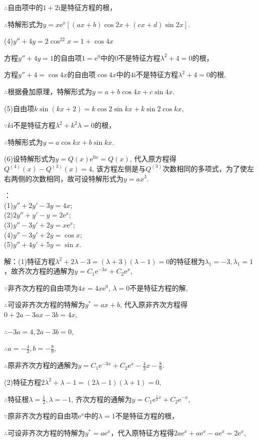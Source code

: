 \documentclass[12pt,UTF8]{ctexart}
\newcommand{\me}[0]{\mathrm e}
\newcommand{\m}[0]{\mathrm }
\begin{document}
\begin{enumerate}
$\therefore$自由项中的$1+2\m i$是特征方程的根，

$\therefore$特解形式为$y=x\me^x[(ax+b)\cos2x+(cx+d)\sin2x]$.

(4)$y''+4y=2\cos^22x=1+\cos4x$

方程$y''+4y=1$的自由项$1=\me^0$中的$0$不是特征方程$\lambda^2+4=0$的根，

方程$y''+4=\cos4x$的自由项$\cos4x$中的$4\m i$不是特征方程$\lambda^2+4=0$的根,

$\therefore$根据叠加原理，特解形式为$y=a+b\cos4x+c\sin4x$.

(5)自由项$k\sin(kx+2)=k\cos2\sin kx+k\sin2\cos kx$,

$\because k\m i$不是特征方程$\lambda^2+k^2\lambda=0$的根，

$\therefore$特解形式为$y=a\cos kx+b\sin kx$.

(6)设特解形式为$y=Q(x)\me^{0x}=Q(x)$, 代入原方程得$Q^{(4)}(x)-Q^{(3)}(x)=4$, 该方程左侧是与$Q^{(3)}$次数相同的多项式，为了使左右两侧的次数相同，故可设特解形式为$y=ax^3$.

：\\
(1)$y''+2y'-3y=4x$;\\
(2)$2y''+y'-y=2\me^x$;\\
(3)$y''-3y'+2y=x\me^x$;\\
(4)$y''-3y'+2y=\cos x$;\\
(5)$y''+4y'+5y=\sin x$.

解：(1)特征方程$\lambda^2+2\lambda-3=(\lambda+3)(\lambda-1)=0$的特征根为$\lambda_1=-3,\lambda_1=1$，故齐次方程的通解为$y=C_1\me^{-3x}+C_2\me^x$,

$\because$非齐次方程的自由项为$4x=4x\me^0$, $\lambda=0$不是特征方程的解,

$\therefore$可设非齐次方程的特解为$y^*=ax+b$, 代入原非齐次方程得$0+2a-3ax-3b=4x$,

$\therefore -3a=4,2a-3b=0$,

$\therefore a=-\frac43,b=-\frac89$,

$\therefore$原非齐次方程的通解为$y=C_1\me^{-3x}+C_2\me^x-\frac43x-\frac89$.

(2)特征方程$2\lambda^2+\lambda-1=(2\lambda-1)(\lambda+1)=0$,

$\therefore$特征根$\lambda=\frac12,\lambda=-1$, 齐次方程的通解为$y=C_1\me^{\frac12x}+C_2\me^{-x}$,

$\because$原非齐次方程的自由项$\me^x$中的$\lambda=1$不是特征方程的根，

$\therefore$可设非齐次方程的特解为$y^*=a\me^x$，代入原特征方程得$2a\me^x+a\me^x-a\me^x=2\me^x$,


\end{enumerate}
\end{document}
